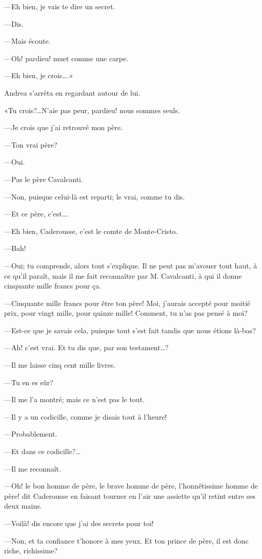 —Eh bien, je vais te dire un secret. 

—Dis. 

—Mais écoute. 

—Oh! pardieu! muet comme une carpe. 

—Eh bien, je crois\dots.» 

Andrea s'arrêta en regardant autour de lui. 

«Tu crois?\dots N'aie pas peur, pardieu! nous sommes seuls. 

—Je crois que j'ai retrouvé mon père. 

—Ton vrai père? 

—Oui. 

—Pas le père Cavalcanti. 

—Non, puisque celui-là est reparti; le vrai, comme tu dis. 

—Et ce père, c'est\dots. 

—Eh bien, Caderousse, c'est le comte de Monte-Cristo. 

—Bah! 

—Oui; tu comprends, alors tout s'explique. Il ne peut pas m'avouer tout haut, à ce qu'il paraît, mais il me fait reconnaître par M. Cavalcanti, à qui il donne cinquante mille francs pour ça. 

—Cinquante mille francs pour être ton père! Moi, j'aurais accepté pour moitié prix, pour vingt mille, pour quinze mille! Comment, tu n'as pas pensé à moi? 

—Est-ce que je savais cela, puisque tout s'est fait tandis que nous étions là-bas? 

—Ah! c'est vrai. Et tu dis que, par son testament\dots? 

—Il me laisse cinq cent mille livres. 

—Tu en es sûr? 

—Il me l'a montré; mais ce n'est pas le tout. 

—Il y a un codicille, comme je disais tout à l'heure! 

—Probablement. 

—Et dans ce codicille?\dots 

—Il me reconnaît. 

—Oh! le bon homme de père, le brave homme de père, l'honnêtissime homme de père! dit Caderousse en faisant tourner en l'air une assiette qu'il retint entre ses deux mains. 

—Voilà! dis encore que j'ai des secrets pour toi! 

—Non, et ta confiance t'honore à mes yeux. Et ton prince de père, il est donc riche, richissime? 

